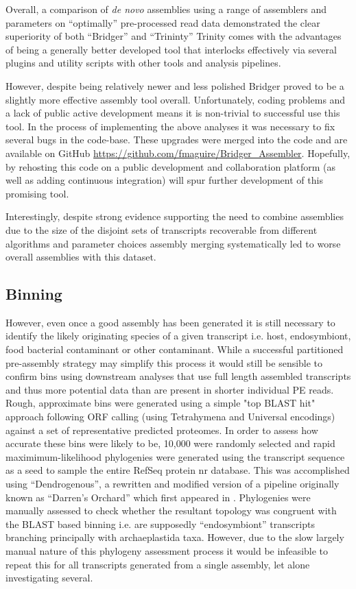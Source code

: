 Overall, a comparison of \textit{de novo} assemblies
using a range of assemblers and parameters on ``optimally'' pre-processed
read data demonstrated the clear superiority of both ``Bridger'' and ``Trininty''
Trinity comes with the advantages of being a generally better developed tool that interlocks effectively via several plugins and utility
scripts with other tools and analysis pipelines.  

However, despite being relatively newer and less polished Bridger proved to be
a slightly more effective assembly tool overall. Unfortunately,
coding problems and a lack of public active development means 
it is non-trivial to successful use this tool.  In the process of 
implementing the above analyses it was necessary to fix several
bugs in the code-base. These upgrades were merged into
the code and are available on GitHub \url{https://github.com/fmaguire/Bridger_Assembler}.
Hopefully, by rehosting this code on a public development and collaboration
platform (as well as adding continuous integration) will 
spur further development of this promising tool.


Interestingly, despite strong evidence supporting the need to combine assemblies due to the 
size of the disjoint sets of transcripts recoverable from different algorithms and parameter
choices \citep{Lowe2014} assembly merging systematically led to worse overall assemblies
with this dataset.


\subsection{Binning}

However, even once a good assembly has been generated it is still necessary to identify the likely
originating species of a given transcript i.e. host, endosymbiont, food bacterial contaminant or other
contaminant.  While a successful partitioned pre-assembly strategy may simplify this process it would still
be sensible to confirm bins using downstream analyses that use full length assembled transcripts and thus
more potential data than are present in shorter individual PE reads.  Rough, approximate bins were
generated using a simple "top BLAST hit" approach following ORF calling (using Tetrahymena and Universal
encodings) against a set of representative predicted proteomes.  In order to assess how accurate these
bins were likely to be, 10,000 were randomly selected and rapid maximimum-likelihood phylogenies were
generated using the transcript sequence as a seed to sample the entire RefSeq protein nr database.
This was accomplished using ``Dendrogenous'', a rewritten and modified version of a pipeline originally known 
as ``Darren's Orchard'' which first appeared in \citep{Richards2009g}.  Phylogenies were manually assessed to check
whether the resultant topology was congruent with the BLAST based binning i.e. are supposedly ``endosymbiont''
transcripts branching principally with archaeplastida taxa.  
However, due to the slow largely manual nature of this phylogeny assessment process it would be infeasible
to repeat this for all transcripts generated from a single assembly, let alone investigating several. 

